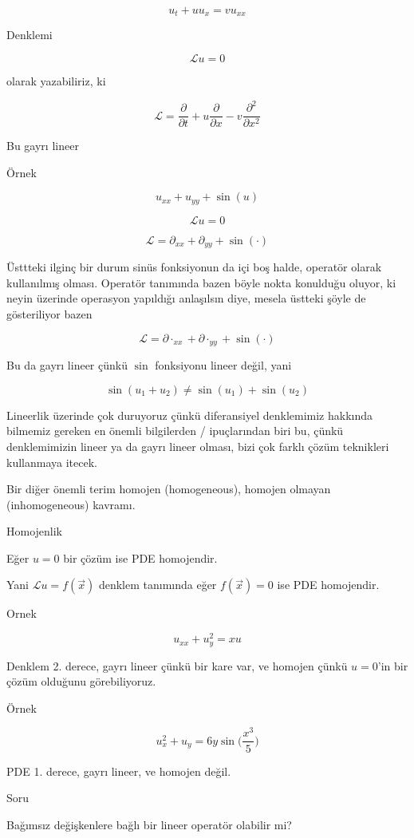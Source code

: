 \documentclass[12pt,fleqn]{article}\usepackage{../../common}
\begin{document}
$$ u_t + u u_x = v u_{xx} $$

Denklemi 

$$ \mathcal{L}u = 0 $$

olarak yazabiliriz, ki 

$$ \mathcal{L} = \frac{\partial }{\partial t} + 
u \frac{\partial }{\partial x} - v\frac{\partial ^2}{\partial x^2}
$$

Bu gayrı lineer

Örnek

$$ u_{xx} + u_{yy} + \sin(u) $$

$$ \mathcal{L} u = 0 $$

$$ \mathcal{L} = \partial_{xx} + \partial_{yy} + \sin(\cdot) $$

Üsttteki ilginç bir durum sinüs fonksiyonun da içi boş halde, operatör
olarak kullanılmış olması. Operatör tanımında bazen böyle nokta konulduğu
oluyor, ki neyin üzerinde operasyon yapıldığı anlaşılsın diye, mesela
üstteki şöyle de gösteriliyor bazen

$$ \mathcal{L} = \partial\cdot_{xx} + \partial\cdot_{yy} + \sin(\cdot) $$

Bu da gayrı lineer çünkü $\sin$ fonksiyonu lineer değil, yani

$$ \sin(u_1 + u_2) \ne \sin(u_1) + \sin(u_2) $$

Lineerlik üzerinde çok duruyoruz çünkü diferansiyel denklemimiz hakkında
bilmemiz gereken en önemli bilgilerden / ipuçlarından biri bu, çünkü
denklemimizin lineer ya da gayrı lineer olması, bizi çok farklı çözüm
teknikleri kullanmaya itecek.

Bir diğer önemli terim homojen (homogeneous), homojen olmayan
(inhomogeneous) kavramı. 

Homojenlik

Eğer $u=0$ bir çözüm ise PDE homojendir. 

Yani $\mathcal{L} u = f(\vec{x})$ denklem tanımında eğer $f(\vec{x})=0$ ise
PDE homojendir.

Ornek

$$ u_{xx} + u_y^2 = xu $$

Denklem 2. derece,  gayrı lineer çünkü bir kare var, ve homojen çünkü
$u=0$'in bir çözüm olduğunu görebiliyoruz. 

Örnek

$$ u_x^2 + u_y = 6y \sin\bigg(\frac{x^3}{5}\bigg) $$

PDE 1. derece,  gayrı lineer, ve homojen değil. 

Soru

Bağımsız değişkenlere bağlı bir lineer operatör olabilir mi? 
\end{document}
